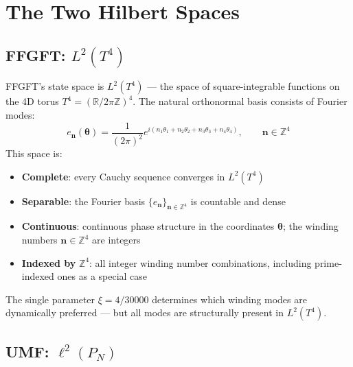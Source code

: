 \clearpage

\section{The Two Hilbert Spaces}

\subsection{FFGFT: \texorpdfstring{$L^2(T^4)$}{L2(T4)}}

FFGFT's state space is $L^2(T^4)$ — the space of square-integrable functions
on the 4D torus $T^4 = (\mathbb{R}/2\pi\mathbb{Z})^4$. The natural orthonormal
basis consists of Fourier modes:
\begin{equation}
  e_{\mathbf{n}}(\symbf{\theta}) = \frac{1}{(2\pi)^2}
  e^{i(n_1\theta_1 + n_2\theta_2 + n_3\theta_3 + n_4\theta_4)},
  \qquad \mathbf{n} \in \mathbb{Z}^4
  \tag{244.1}
\end{equation}
This space is:
\begin{itemize}
  \item \textbf{Complete}: every Cauchy sequence converges in $L^2(T^4)$
  \item \textbf{Separable}: the Fourier basis $\{e_{\mathbf{n}}\}_{\mathbf{n}\in\mathbb{Z}^4}$
    is countable and dense
  \item \textbf{Continuous}: continuous phase structure in the coordinates $\symbf{\theta}$; the winding numbers $\mathbf{n}\in\mathbb{Z}^4$ are integers
  \item \textbf{Indexed by} $\mathbb{Z}^4$: all integer winding number combinations,
    including prime-indexed ones as a special case
\end{itemize}

The single parameter $\xi = 4/30000$ determines which winding modes are
dynamically preferred — but all modes are structurally present in $L^2(T^4)$.

\subsection{UMF: \texorpdfstring{$\ell^2(P_N)$}{ell2(P\_N)}}

